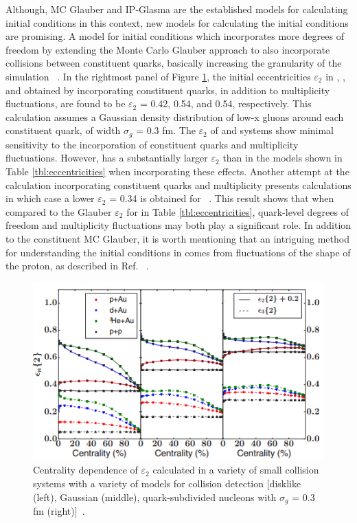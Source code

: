 Although, MC Glauber and IP-Glasma are the established models for calculating initial conditions in this context, new models for calculating the initial conditions are promising. A model for initial conditions which incorporates more degrees of freedom by extending the Monte Carlo Glauber approach to also incorporate collisions between constituent quarks, basically increasing the granularity of the simulation ~\cite{PhysRevC.67.064905}. In the rightmost panel of Figure \ref{fig:epsilon_2_theory}, the initial eccentricities $\varepsilon_2$ in \pau, \dau, and \hau obtained by incorporating constituent quarks, in addition to multiplicity fluctuations, are found to be $\varepsilon_2$ = 0.42, 0.54, and 0.54, respectively. This calculation assumes a Gaussian density distribution of low-x gluons around each constituent quark, of width $\sigma_g$ = 0.3 fm. The $\varepsilon_2$ of \dau and \hau systems show minimal sensitivity to the incorporation of constituent quarks and multiplicity fluctuations. However, \pau has a substantially larger $\varepsilon_2$ than in the models shown in Table \ref{tbl:eccentricities} when incorporating these effects. Another attempt at the calculation incorporating constituent quarks and multiplicity presents calculations in which case a lower $\varepsilon_2$ = 0.34 is obtained for \pau ~\cite{PhysRevC.94.024919}. This result shows that when compared to the Glauber $\varepsilon_2$ for \pau in Table \ref{tbl:eccentricities}, quark-level degrees of freedom and multiplicity fluctuations may both play a significant role. In addition to the constituent MC Glauber, it is worth mentioning that an intriguing method for understanding the initial conditions in \pau comes from fluctuations of the shape of the proton, as described in Ref. ~\cite{Schlichting2014313}. 

\begin{figure}[!ht]
\begin{center}
\includegraphics[width=0.6\linewidth]{figs/theoretical_epsilon_values.png}
\caption{Centrality dependence of $\varepsilon_2$ calculated in a variety of small collision systems with a variety of models for collision detection [disklike (left), Gaussian (middle), quark-subdivided nucleons with $\sigma_g$ = 0.3 fm (right)]~\cite{PhysRevC.94.024919}.}
\label{fig:epsilon_2_theory}
\end{center}
\end{figure}

